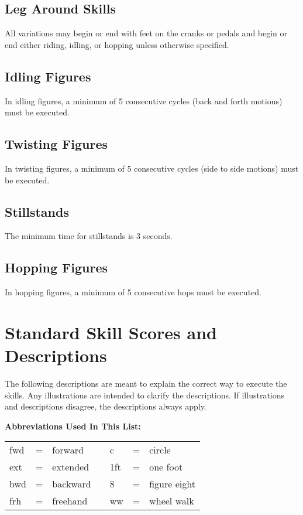 \subsection{Leg Around Skills}
All variations may begin or end with feet on the cranks or pedals and begin or end either riding, idling, or hopping unless otherwise specified.

\subsection{Idling Figures}
In idling figures, a minimum of 5 consecutive cycles (back and forth motions) must be executed.

\subsection{Twisting Figures}
In twisting figures, a minimum of 5 consecutive cycles (side to side motions) must be executed.

\subsection{Stillstands}
The minimum time for stillstands is 3 seconds.

\subsection{Hopping Figures}
In hopping figures, a minimum of 5 consecutive hops must be executed.

\section{Standard Skill Scores and Descriptions}
The following descriptions are meant to explain the correct way to execute the skills.
Any illustrations are intended to clarify the descriptions.
If illustrations and descriptions disagree, the descriptions always apply.

\textbf{Abbreviations Used In This List:}
\begin{center}
\begin{tabular}{l l l p{2cm} l l l}
fwd & = & forward & & c & = & circle \\
ext & = & extended & & 1ft & = & one foot \\
bwd & = & backward & & 8 & = & figure eight \\
frh & = & freehand & & ww & = & wheel walk \\
\end{tabular}
\end{center}
\newpage

